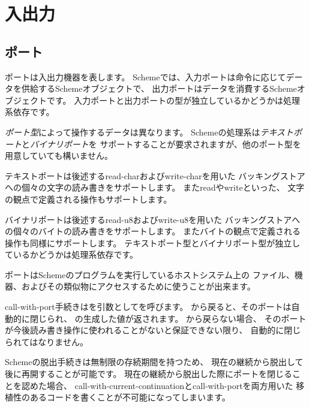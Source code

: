 \section{入出力}

\subsection{ポート}
\label{portsection}

ポートは入出力機器を表します。
Schemeでは、入力ポートは命令に応じてデータを供給するSchemeオブジェクトで、
出力ポートはデータを消費するSchemeオブジェクトです。
入力ポートと出力ポートの型が独立しているかどうかは処理系依存です。

{\em ポート型}によって操作するデータは異なります。
Schemeの処理系は{\em テキストポート}と{\em バイナリポート}を
サポートすることが要求されますが、他のポート型を用意していても構いません。

テキストポートは後述する{\cf read-char}および{\cf write-char}を用いた
バッキングストアへの個々の文字の読み書きをサポートします。
また{\cf read}や{\cf write}といった、
文字の観点で定義される操作もサポートします。

バイナリポートは後述する{\cf read-u8}および{\cf write-u8}を用いた
バッキングストアへの個々のバイトの読み書きをサポートします。
またバイトの観点で定義される操作も同様にサポートします。
テキストポート型とバイナリポート型が独立しているかどうかは処理系依存です。

ポートはSchemeのプログラムを実行しているホストシステム上の
ファイル、機器、およびその類似物にアクセスするために使うことが出来ます。

\begin{entry}{%
}

{\cf call-with-port}手続きはを引数としてを呼びます。
から戻ると、そのポートは自動的に閉じられ、
の生成した値が返されます。
から戻らない場合、
そのポートが今後読み書き操作に使われることがないと保証できない限り、
自動的に閉じられてはなりません。

\begin{rationale}
Schemeの脱出手続きは無制限の存続期間を持つため、
現在の継続から脱出して後に再開することが可能です。
現在の継続から脱出した際にポートを閉じることを認めた場合、
{\cf call-with-current-continuation}と{\cf call-with-port}を両方用いた
移植性のあるコードを書くことが不可能になってしまいます。
\end{rationale} 

\end{entry}

